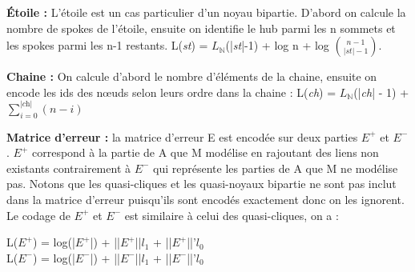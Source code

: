 \textbf{Étoile :} L'étoile est un cas particulier d'un noyau bipartie. D'abord on calcule la nombre de spokes de l'étoile, ensuite on identifie le hub parmi les n sommets et les spokes parmi les n-1 restants.
L(\textit{st}) = $L_{\mathbb{N}}$(|\textit{st}|-1) +  log n + log ${n-1}\choose{|st|-1}$.

\textbf{Chaine :} On calcule d'abord le nombre d'éléments de la chaine, ensuite on encode les ids des nœuds selon leurs ordre dans la chaine :
L(\textit{ch}) = $L_{\mathbb{N}}$(|\textit{ch}| - 1) + $\sum\limits_{i=0}^{|\textit{ch}|} ( n - i )$

\textbf{Matrice d'erreur :} la matrice d'erreur E est encodée sur deux parties $E^{+}$ et $E^{-}$. $E^{+}$  correspond à la partie de A que M modélise en rajoutant des liens non existants contrairement à $E^{-}$ qui représente les parties de A que M ne modélise pas. Notons que les quasi-cliques et les quasi-noyaux bipartie ne sont pas inclut dans la matrice d'erreur puisqu'ils sont encodés exactement donc on les ignorent. Le codage de $E^{+}$ et $E^{-}$ est similaire à celui des quasi-cliques, on a :
\begin{center}
L(${E}^{+}$) = log(|${E}^{+}$|) + ||${E}^{+}$||\textit{$l_{1}$} + ||${E}^{+}$||'\textit{$l_{0}$}\\
L(${E}^{-}$) = log(|${E}^{-}$|) + ||${E}^{-}$||\textit{$l_{1}$} + ||${E}^{-}$||'\textit{$l_{0}$}\\
\end{center} 
 


